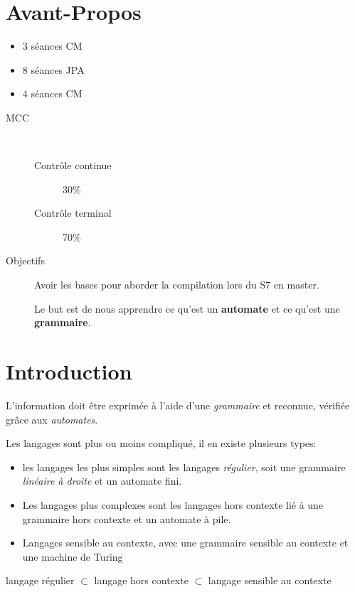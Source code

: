 \documentclass[12pt,a4paper,openany]{book}
\begin{document}
	\thispagestyle{empty} %
	\titleBC 
	\dominitoc
	\setcounter{tocdepth}{1}
	\setcounter{secnumdepth}{3}
	\setcounter{minitocdepth}{1}
	\chapter*{Avant-Propos}
	\begin{itemize}
		\item 3 séances CM
		\item 8 séances JPA
		\item 4 séances CM
	\end{itemize}
	\begin{description}
		\item[MCC]~
	\begin{description}
		\item[Contrôle continue] 30\%
		\item[Contrôle terminal] 70\%
	\end{description}
\item[Objectifs] 
	Avoir les bases pour aborder la compilation lors du S7 en master.

	Le but est de nous apprendre ce qu'est un \textbf{automate} et ce qu'est une \textbf{grammaire}.
	\end{description}
	\tableofcontents
	\chapter{Introduction}
	L'information doit être exprimée à l'aide d'une \textit{grammaire} et reconnue, vérifiée grâce aux \textit{automates}.

	Les langages sont plus ou moins compliqué, il en existe plusieurs types: 
	\begin{itemize}
		\item les langages les plus simples sont les langages \textit{régulier}, soit une grammaire \textit{linéaire à droite} et un
	automate fini.
		\item Les langages plus complexes sont les langages hors contexte lié à une grammaire hors contexte et un automate à pile.
		\item Langages sensible au contexte, avec une grammaire sensible au contexte et une machine de Turing
	\end{itemize}
	\begin{remarque}
		langage régulier $\subset$ langage hors contexte $\subset$ langage sensible au contexte 
	\end{remarque}
\end{document}
